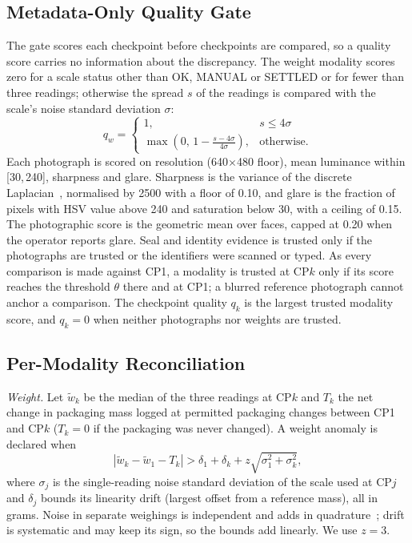 \documentclass[conference]{IEEEtran}
\begin{document}
\subsection{Metadata-Only Quality Gate}
The gate scores each checkpoint before checkpoints are compared, so a quality score carries no information about the discrepancy. The weight modality scores zero for a scale status other than OK, MANUAL or SETTLED or for fewer than three readings; otherwise the spread $s$ of the readings is compared with the scale's noise standard deviation $\sigma$:
\begin{equation}
q_w = \begin{cases} 1, & s \le 4\sigma\\ \max\!\left(0,\, 1 - \frac{s-4\sigma}{4\sigma}\right), & \text{otherwise.}\end{cases}
\end{equation}
Each photograph is scored on resolution (640$\times$480 floor), mean luminance within [30,\,240], sharpness and glare. Sharpness is the variance of the discrete Laplacian~\cite{pech}, normalised by 2500 with a floor of 0.10, and glare is the fraction of pixels with HSV value above 240 and saturation below 30, with a ceiling of 0.15. The photographic score is the geometric mean over faces, capped at 0.20 when the operator reports glare. Seal and identity evidence is trusted only if the photographs are trusted or the identifiers were scanned or typed. As every comparison is made against CP1, a modality is trusted at CP$k$ only if its score reaches the threshold $\theta$ there and at CP1; a blurred reference photograph cannot anchor a comparison. The checkpoint quality $q_k$ is the largest trusted modality score, and $q_k=0$ when neither photographs nor weights are trusted.

\subsection{Per-Modality Reconciliation}
\emph{Weight.} Let $\tilde w_k$ be the median of the three readings at CP$k$ and $T_k$ the net change in packaging mass logged at permitted packaging changes between CP1 and CP$k$ ($T_k=0$ if the packaging was never changed). A weight anomaly is declared when
\begin{equation}
\left|\tilde w_k - \tilde w_1 - T_k\right| > \delta_1 + \delta_k + z\sqrt{\sigma_1^2+\sigma_k^2},
\end{equation}
where $\sigma_j$ is the single-reading noise standard deviation of the scale used at CP$j$ and $\delta_j$ bounds its linearity drift (largest offset from a reference mass), all in grams. Noise in separate weighings is independent and adds in quadrature~\cite{gum}; drift is systematic and may keep its sign, so the bounds add linearly. We use $z=3$.
\end{document}

